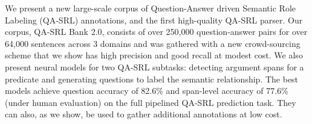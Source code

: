 We present a new large-scale corpus of Question-Answer driven Semantic Role Labeling (QA-SRL) annotations, and the first high-quality QA-SRL parser. Our corpus, QA-SRL Bank 2.0, consists of over 250,000 question-answer pairs for over 64,000 sentences across 3 domains and was gathered with a new crowd-sourcing scheme that we show has high precision and good recall at modest cost. We also present neural models for two QA-SRL subtasks: detecting argument spans for a predicate and generating questions to label the semantic relationship. The best models achieve question accuracy of 82.6\% and span-level accuracy of 77.6\% (under human evaluation) on the full pipelined QA-SRL prediction task. They can also, as we show, be used to gather additional annotations at low cost.
